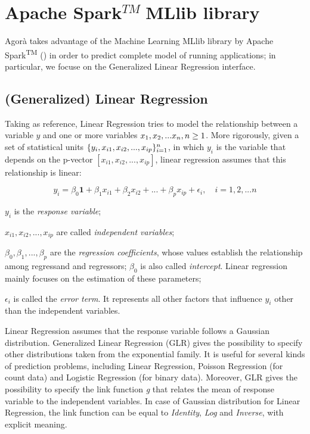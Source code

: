 \section{Apache Spark\texorpdfstring{$^{TM}\;$}MMLlib library}

Agorà takes advantage of the Machine Learning MLlib library by Apache Spark\textsuperscript{TM} (\cite{spark2015apache}) in order to predict complete model of running applications; in particular, we focuse on the Generalized Linear Regression interface.


\subsection{(Generalized) Linear Regression}\label{glr}

Taking \cite{site:caltechML2012} as reference, Linear Regression tries to model the relationship between a variable $y$ and one or more variables $x_1,x_2,\\...x_n,n\ge1$. More rigorously, given a set of statistical units $\{y_i,x_{i1},x_{i2},\\...,x_{ip}\}_{i = 1}^n$, in which $y_i$ is the variable that depends on the p-vector $[x_{i1}, x_{i2}, ..., x_{ip}]$, linear regression assumes that this relationship is linear:

\begin{equation}
    y_i = \beta_0\boldsymbol{1} + \beta_1x_{i1} + \beta_2x_{i2} + ... +  \beta_px_{ip} + \epsilon_i, \quad i = 1, 2, ... n
\end{equation}

$y_i$ is the \textit{response variable};

$x_{i1}, x_{i2}, ..., x_{ip}$ are called \textit{independent variables};

$\beta_0, \beta_1, ..., \beta_p$ are the \textit{regression coefficients}, whose values establish the relationship among regressand and regressors; $\beta_0$ is also called \textit{intercept}. Linear regression mainly focuses on the estimation of these parameters;

$\epsilon_i$ is called the \textit{error term}. It represents all other factors that influence $y_i$ other than the independent variables.

Linear Regression assumes that the response variable follows a Gaussian distribution. Generalized Linear Regression (GLR) gives the possibility to specify other distributions taken from the exponential family. It is useful for several kinds of prediction problems, including Linear Regression, Poisson Regression (for count data) and Logistic Regression (for binary data). Moreover, GLR gives the possibility to specify the link function \textit{g} that relates the mean of response variable to the independent variables. In case of Gaussian distribution for Linear Regression, the link function can be equal to \textit{Identity}, \textit{Log} and \textit{Inverse}, with explicit meaning.



